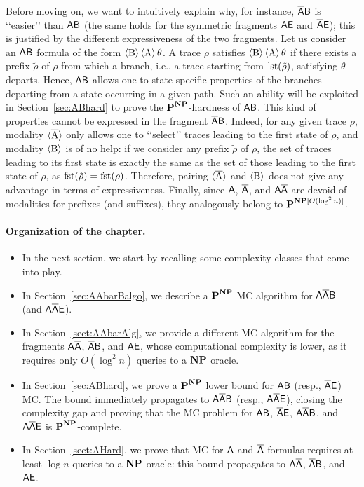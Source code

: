 Before moving on, we want to intuitively explain why, for instance, $\mathsf{\overline{A}B}$ is \lq\lq easier\rq\rq{} than $\mathsf{AB}$ (the same holds for the symmetric fragments $\mathsf{AE}$ and $\mathsf{\overline{A}E}$); this is justified by the different expressiveness of the two fragments.
Let us consider an $\mathsf{A}\mathsf{B}$ formula of the form $\operatorname{\langle B\rangle} \operatorname{\langle A\rangle} \theta$. A trace $\rho$ satisfies $\operatorname{\langle B\rangle} \operatorname{\langle A\rangle} \theta$ if there exists a prefix $\tilde{\rho}$ of $\rho$ from which a branch, i.e., a trace starting from $\operatorname{lst}(\tilde{\rho})$, satisfying $\theta$ departs. 
Hence, $\mathsf{A}\mathsf{B}$ allows one to state specific properties of the branches departing from a state occurring in a given path. Such an ability will be exploited in Section~\ref{sec:ABhard} to prove the $\textbf{P}^{\textbf{NP}}$-hardness of $\mathsf{AB}$.
%
This kind of properties cannot be expressed in the fragment $\mathsf{\overline{A}B}$. Indeed, for any given trace $\rho$, modality $\operatorname{\langle \overline{A}\rangle}$ only allows one to \lq\lq select\rq\rq{} traces leading to the first state of $\rho$, and modality $\operatorname{\langle B\rangle}$ is of no help: if we consider any prefix $\tilde{\rho}$ of $\rho$, the set of traces leading to its first state is exactly the same as the set of those leading to the first state of $\rho$, as $\operatorname{fst}(\tilde{\rho}) = \operatorname{fst}(\rho)$. Therefore, pairing $\operatorname{\langle \overline{A}\rangle}$ and $\operatorname{\langle B\rangle}$ does not give any advantage in terms of expressiveness. 
%
Finally, since $\mathsf{A}$, $\mathsf{\overline{A}}$, and $\mathsf{A\overline{A}}$ are devoid of modalities for prefixes (and suffixes), they analogously belong to $\textbf{P}^{\textbf{NP}[O(\log^2 n)]}$.

\paragraph*{Organization of the chapter.}
\begin{itemize}
	\item In the next section, we start by recalling some complexity classes that come into play.
	\item In Section~\ref{sec:AAbarBalgo}, we describe a $\textbf{P}^{\textbf{NP}}$ MC algorithm for $\mathsf{A\overline{A}B}$ (and $\mathsf{A\overline{A}E}$). 
	\item In Section~\ref{sect:AAbarAlg}, we provide a different MC algorithm for the fragments $\mathsf{A\overline{A}}$, $\mathsf{\overline{A}B}$, and $\mathsf{AE}$, whose computational complexity is lower, 
as it requires only $O(\log^2 n)$ queries to a $\textbf{NP}$ oracle.
	\item In Section~\ref{sec:ABhard}, we prove a $\textbf{P}^{\textbf{NP}}$ lower bound for $\mathsf{AB}$ (resp., $\mathsf{\overline{A}E}$) MC. The bound immediately propagates to $\mathsf{A\overline{A}B}$ (resp., $\mathsf{A\overline{A}E}$), closing the complexity gap and proving that the MC problem for  $\mathsf{AB}$, $\mathsf{\overline{A}E}$, $\mathsf{A\overline{A}B}$, and $\mathsf{A\overline{A}E}$ is $\textbf{P}^{\textbf{NP}}$-complete. 
	\item In Section~\ref{sect:AHard}, we prove that MC for $\mathsf{A}$ and $\mathsf{\overline{A}}$ formulas requires at least $\log n$ queries to a $\textbf{NP}$ oracle: this bound propagates to $\mathsf{A\overline{A}}$, $\mathsf{\overline{A}B}$, and $\mathsf{AE}$.
\end{itemize}
